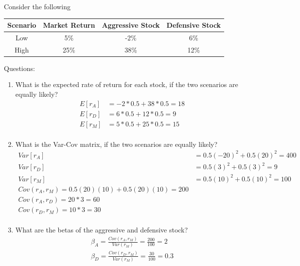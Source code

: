 \documentclass[11pt]{article}
\theoremstyle{definition}
\begin{document}
    \begin{shaded}
        Consider the following\\
        
        \begin{tabular}{cccc}
        \toprule
        \textbf{Scenario} & \textbf{Market Return} & \textbf{Aggressive Stock} & \textbf{Defensive Stock} \\
        \midrule
        Low & 5\% & -2\% & 6\% \\
        \hline
        High & 25\% & 38\% & 12\% \\
        \bottomrule
        \end{tabular}
        \vspace{1em}
        
        Questions:
        \begin{enumerate}
            \item What is the expected rate of return for each stock, if the two scenarios are equally likely?
            \begin{align*}
                E[r_A] &= -2*0.5 + 38*0.5 = 18 \\
                E[r_D] &= 6*0.5 + 12*0.5 = 9\\
                E[r_M] &= 5*0.5 + 25*0.5 = 15\\
            \end{align*}
            \item What is the Var-Cov matrix, if the two scenarios are equally likely?
            \begin{align*}
                Var[r_A] &= 0.5(-20)^2 + 0.5(20)^2 = 400 \\
                Var[r_D] &= 0.5(3)^2 + 0.5(3)^2 = 9\\
                Var[r_M] &= 0.5(10)^2 + 0.5(10)^2 = 100\\
                Cov(r_A,r_M) = 0.5(20)(10) + 0.5(20)(10) = 200\\
                Cov(r_A,r_D) = 20*3 = 60\\
                Cov(r_D,r_M) = 10*3 = 30\\
            \end{align*}
            \item What are the betas of the aggressive and defensive stock?
                \begin{align*}
                    \beta_A =  \frac{Cov(r_A,r_M)}{Var(r_M)} = \frac{200}{100} = 2\\
                    \beta_D =  \frac{Cov(r_D,r_M)}{Var(r_M)} = \frac{30}{100} = 0.3\\

\end{align*}
\end{enumerate}
\end{shaded}
\end{document}
